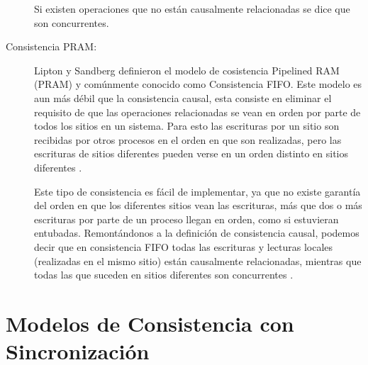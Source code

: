 \begin{description}
Si existen operaciones que no están causalmente relacionadas se dice que son concurrentes.

\item[Consistencia PRAM: ]
Lipton y Sandberg \cite{lipton:1988} definieron el modelo de cosistencia Pipelined RAM (PRAM) y comúnmente conocido como Consistencia FIFO. Este modelo es aun más débil que la consistencia causal, esta consiste en eliminar el requisito de que las operaciones relacionadas se vean en orden por parte de todos los sitios en un sistema. Para esto las escrituras por un sitio son recibidas por otros procesos en el orden en que son realizadas, pero las escrituras de sitios diferentes pueden verse en un orden distinto en sitios diferentes \cite{mosberger:1993}.

Este tipo de consistencia es fácil de implementar, ya que no existe garantía del orden en que los diferentes sitios vean las escrituras, más que dos o más escrituras por parte de un proceso llegan en orden, como si estuvieran entubadas. Remontándonos a la definición de consistencia causal, podemos decir que en consistencia FIFO todas las escrituras y lecturas locales (realizadas en el mismo sitio) están causalmente relacionadas, mientras que todas las que suceden en sitios diferentes son concurrentes \cite{mosberger:1993}.


\end{description}


\section{Modelos de Consistencia con Sincronización}

